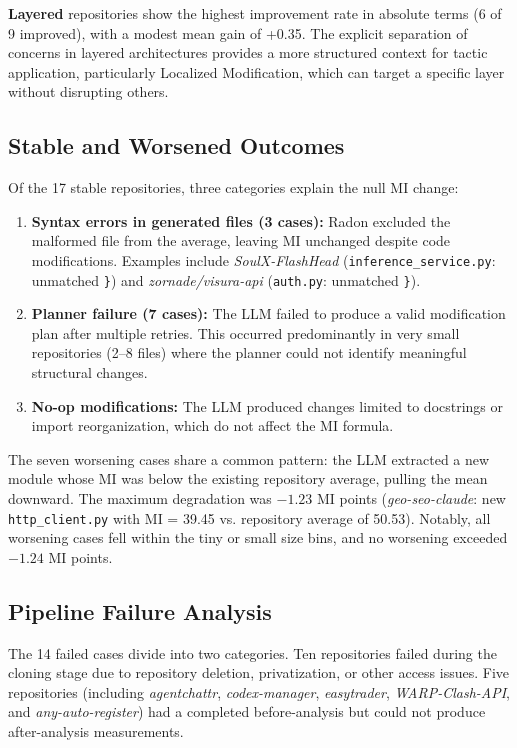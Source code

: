 \documentclass[sigconf,review,anonymous]{acmart}
\begin{document}
\textbf{Layered} repositories show the highest improvement rate in absolute terms (6 of 9 improved), with a modest mean gain of +0.35. The explicit separation of concerns in layered architectures provides a more structured context for tactic application, particularly Localized Modification, which can target a specific layer without disrupting others.

\subsection{Stable and Worsened Outcomes}

Of the 17 stable repositories, three categories explain the null MI change:

\begin{enumerate}[nosep]
    \item \textbf{Syntax errors in generated files (3 cases):} Radon excluded the malformed file from the average, leaving MI unchanged despite code modifications. Examples include \textit{SoulX-FlashHead} (\texttt{inference\_service.py}: unmatched \texttt{\}}) and \textit{zornade/visura-api} (\texttt{auth.py}: unmatched \texttt{\}}).
    \item \textbf{Planner failure (7 cases):} The LLM failed to produce a valid modification plan after multiple retries. This occurred predominantly in very small repositories (2--8 files) where the planner could not identify meaningful structural changes.
    \item \textbf{No-op modifications:} The LLM produced changes limited to docstrings or import reorganization, which do not affect the MI formula.
\end{enumerate}

The seven worsening cases share a common pattern: the LLM extracted a new module whose MI was below the existing repository average, pulling the mean downward. The maximum degradation was $-1.23$ MI points (\textit{geo-seo-claude}: new \texttt{http\_client.py} with MI = 39.45 vs. repository average of 50.53). Notably, all worsening cases fell within the tiny or small size bins, and no worsening exceeded $-1.24$ MI points.

\subsection{Pipeline Failure Analysis}

The 14 failed cases divide into two categories. Ten repositories failed during the cloning stage due to repository deletion, privatization, or other access issues. Five repositories (including \textit{agentchattr}, \textit{codex-manager}, \textit{easytrader}, \textit{WARP-Clash-API}, and \textit{any-auto-register}) had a completed before-analysis but could not produce after-analysis measurements.
\end{document}

